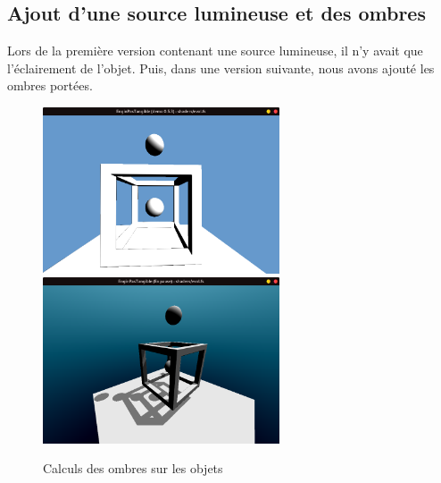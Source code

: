 \subsection{Ajout d'une source lumineuse et des ombres}
Lors de la première version contenant une source lumineuse, il n'y avait que l'éclairement de l'objet.
Puis, dans une version suivante, nous  avons ajouté les ombres portées.
\begin{figure}[h]
    \centering
    \includegraphics[width=7cm]{images/screens/ombresObjet.png}
    \includegraphics[width=7cm]{images/screens/ombresSurObjet.png}
    \caption{Calculs des ombres sur les objets}
    \label{fig:ombresshader}
\end{figure}